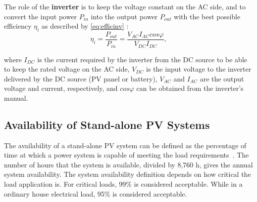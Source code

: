 \documentclass[review]{elsarticle}
\begin{document}
The role of the \textbf{inverter} is to keep the voltage constant on the AC side, %
and to convert the input power $ P_{in} $ into the output power $ P_{out} $ with the best possible efficiency $ \eta_{i} $ as described by \eqref{eq:efficinv} \citep{Hansen}:
%
\begin{equation}
\label{eq:efficinv}
\eta_{i} = \dfrac{P_{out}}{P_{in}} = \dfrac{V_{AC} I_{AC} cos\varphi}{V_{DC}I_{DC}},
\end{equation}

\noindent where $ I_{DC} $ is the current required by the inverter from the DC source to be able to keep the rated voltage on the AC side, $ V_{DC} $ is the input voltage to the inverter delivered by the DC source (PV panel or battery),  $ V_{AC}  $ and $ I_{AC} $ are the output voltage and current, respectively, and $ cos \varphi $ can be obtained from the inverter's manual.

%
%
\subsection{Availability of Stand-alone PV Systems}
\label{sec:availability}
The availability of a stand-alone PV system can be defined as the percentage of time at which a power system is capable of meeting the load requirements~\citep{Khatib2014}. The number of hours that the system is available, divided by 8,760 h, gives the annual system availability.
The system availability definition depends on how critical the load application is. For critical loads, 99\% is considered acceptable. While in a ordinary house electrical load, 95\% is considered acceptable. %
%
%
\end{document}
